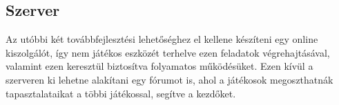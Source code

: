 \subsection*{Szerver}
\label{szerver}
Az utóbbi két továbbfejlesztési lehetőséghez el kellene készíteni egy online kiszolgálót, így nem játékos eszközét terhelve ezen feladatok végrehajtásával, valamint ezen keresztül biztosítva folyamatos működésüket. 
Ezen kívül a szerveren ki lehetne alakítani egy fórumot is, ahol a játékosok megoszthatnák tapasztalataikat a többi játékossal, segítve a kezdőket. 








